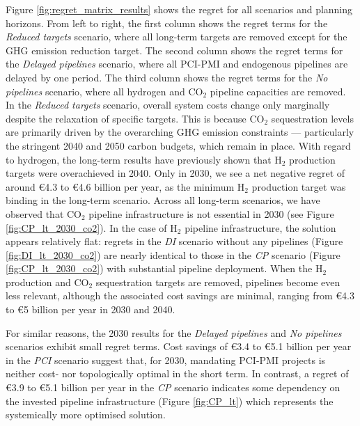 \documentclass[pdflatex,sn-nature]{sn-jnl}%
\theoremstyle{thmstyleone}%
\theoremstyle{thmstyletwo}%
\theoremstyle{thmstylethree}%
\begin{document}
Figure \ref{fig:regret_matrix_results} shows the regret for all scenarios and planning horizons. From left to right, the first column shows the regret terms for the \textit{Reduced targets} scenario, where all long-term targets are removed except for the GHG emission reduction target. The second column shows the regret terms for the \textit{Delayed pipelines} scenario, where all PCI-PMI and endogenous pipelines are delayed by one period. The third column shows the regret terms for the \textit{No pipelines} scenario, where all hydrogen and CO$_2$ pipeline capacities are removed.
In the \textit{Reduced targets} scenario, overall system costs change only marginally despite the relaxation of specific targets. This is because CO$_2$ sequestration levels are primarily driven by the overarching GHG emission constraints --- particularly the stringent 2040 and 2050 carbon budgets, which remain in place. With regard to hydrogen, the long-term results have previously shown that H$_2$ production targets were overachieved in 2040. Only in 2030, we see a net negative regret of around €4.3 to €4.6 billion per year, as the minimum H$_2$ production target was binding in the long-term scenario. Across all long-term scenarios, we have observed that CO$_2$ pipeline infrastructure is not essential in 2030 (see Figure \ref{fig:CP_lt_2030_co2}). In the case of H$_2$ pipeline infrastructure, the solution appears relatively flat: regrets in the \textit{DI} scenario without any pipelines (Figure \ref{fig:DI_lt_2030_co2}) are nearly identical to those in the \textit{CP} scenario (Figure \ref{fig:CP_lt_2030_co2}) with substantial pipeline deployment. When the H$_2$ production and CO$_2$ sequestration targets are removed, pipelines become even less relevant, although the associated cost savings are minimal, ranging from €4.3 to €5 billion per year in 2030 and 2040.

For similar reasons, the 2030 results for the \textit{Delayed pipelines} and \textit{No pipelines} scenarios exhibit small regret terms. Cost savings of €3.4 to €5.1 billion per year in the \textit{PCI} scenario suggest that, for 2030, mandating PCI-PMI projects is neither cost- nor topologically optimal in the short term. In contrast, a regret of €3.9 to €5.1 billion per year in the \textit{CP} scenario indicates some dependency on the invested pipeline infrastructure (Figure \ref{fig:CP_lt}) which represents the systemically more optimised solution.
\end{document}
